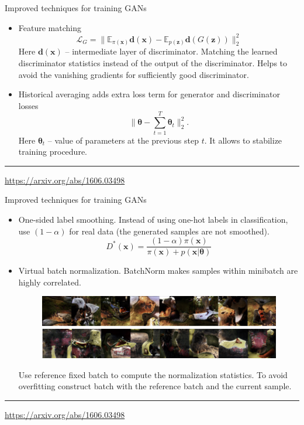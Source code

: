 \documentclass{beamer}
\newcommand{\bx}{\mathbf{x}}
\newcommand{\bz}{\mathbf{z}}
\newcommand{\bbE}{\mathbb{E}}
\newcommand{\cL}{\mathcal{L}}
\newcommand{\btheta}{\boldsymbol{\theta}}
\begin{document}
\begin{frame}{Improved techniques for training GANs}
	\begin{itemize}
		\item Feature matching
		\[
			\cL_G = \| \bbE_{\pi(\bx)} \mathbf{d}(\bx) - \bbE_{p(\bz)} \mathbf{d}(G(\bz)) \|_2^2
		\]
		Here $\mathbf{d}(\bx)$ -- intermediate layer of discriminator. Matching the learned discriminator statistics instead of the output of the discriminator. Helps to avoid the vanishing gradients for sufficiently good discriminator.
		\item Historical averaging adds extra loss term for generator and discriminator losses
		\vspace{-0.2cm}
		\[
		 \| \btheta - \sum_{t=1}^T \btheta_t\|^2_2.
		\]
		Here $\btheta_t$ -- value of parameters at the previous step $t$. It allows to stabilize training procedure.
	\end{itemize}
	\vfill
	\hrule\medskip
	{\scriptsize \href{https://arxiv.org/abs/1606.03498}{https://arxiv.org/abs/1606.03498}}
\end{frame}
\begin{frame}{Improved techniques for training GANs}
	\begin{itemize}
		\item One-sided label smoothing. Instead of using one-hot labels in classification, use $(1 - \alpha)$ for real data (the generated samples are not smoothed).
		\[
			D^*(\bx) = \frac{(1 - \alpha )\pi(\bx)}{\pi(\bx) + p(\bx | \btheta)}
		\]
		\item Virtual batch normalization. BatchNorm makes samples within minibatch are highly correlated.
		\begin{figure}
			\centering
			\includegraphics[width=0.6\linewidth]{figs/virtual_batch_norm}
		\end{figure}
	Use reference fixed batch to compute the normalization statistics. To avoid overfitting construct batch with the reference batch and the current sample. 
	\end{itemize}
	\vfill
	\hrule\medskip
	{\scriptsize \href{https://arxiv.org/abs/1606.03498}{https://arxiv.org/abs/1606.03498}}
\end{frame}
\end{document}
